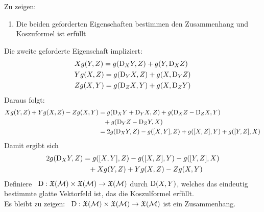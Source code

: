 \begin{bew}
Zu zeigen:
\begin{enumerate}
\item Die beiden geforderten Eigenschaften bestimmen den Zusammenhang und Koszuformel ist erfüllt
\end{enumerate}
Die zweite geforderte Eigenschaft impliziert:
\begin{align*}
&X g(Y, Z) = g(\mathrm{D}_X Y, Z) + g(Y, \mathrm{D}_X Z)\\
&Y g(X , Z) = g (\mathrm{D}_Y X, Z) + g(X, \mathrm{D}_Y Z)\\
&Z g(X, Y) = g(\mathrm{D}_Z X, Y) + g(X, \mathrm{D}_Z Y)
\end{align*}
Daraus folgt:
\begin{align*}
X g(Y, Z) + Y g(X , Z) - Z g(X, Y) &= g(\covd_X Y + \covd_Y X, Z) + g(\covd_X Z - \covd_Z X , Y)\\
 & \phantom{=}+ g(\covd_Y Z - \covd_Z Y, X) \\
 &= 2 g(\covd_X Y, Z) - g(\comm{X}{Y}, Z) + g(\comm{X}{Z}, Y) + g(\comm{Y}{Z}, X)
\end{align*}
Damit ergibt sich
\begin{align}
2 g(\covd_X Y, Z) &= g(\comm{X}{Y}, Z) - g(\comm{X}{Z}, Y) - g(\comm{Y}{Z}, X)\\
&\phantom{=} + X g(Y, Z) + Y g(X, Z) - Z g(X, Y)
\end{align}
Definiere  \ $\mathrm{D} : \mathfrak{X}(\mathcal{M}) \times \mathfrak{X}(\mathcal{M}) \to \mathfrak{X}(\mathcal{M})$
durch $\mathrm{D} (X, Y)$, welches das eindeutig bestimmte glatte Vektorfeld ist, das die Koszulformel erfüllt.\\
Es bleibt zu zeigen: \
$\mathrm{D} : \mathfrak{X}(\mathcal{M}) \times \mathfrak{X}(\mathcal{M}) \to \mathfrak{X}(\mathcal{M}) $ ist ein Zusammenhang.


\end{bew}
